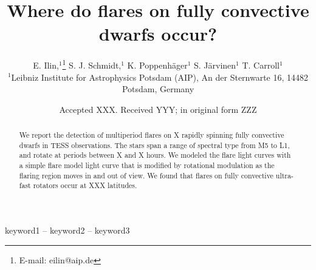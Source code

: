 \documentclass[fleqn,usenatbib,letters]{mnras}%
\title[Where do flares on fully convective dwarfs occur?]{Where do flares on fully convective dwarfs occur?}
\author[E. Ilin et al.]{
E. Ilin,$^{1}$\thanks{E-mail: eilin@aip.de}
S. J. Schmidt,$^{1}$
K. Poppenh\"ager$^{1}$
S. J\"arvinen$^{1}$
T. Carroll$^{1}$
\\
$^{1}$Leibniz Institute for Astrophysics Potsdam (AIP), An der Sternwarte 16, 14482 Potsdam, Germany\\
}
\date{Accepted XXX. Received YYY; in original form ZZZ}
\begin{document}
\label{firstpage}
\pagerange{\pageref{firstpage}--\pageref{lastpage}}
\maketitle

\begin{abstract}
We report the detection of multiperiod flares on X rapidly spinning fully convective dwarfs in TESS observations. The stars span a range of spectral type from M5 to L1, and rotate at periods between X and X hours. We modeled the flare light curves with a simple flare model light curve that is modified by rotational modulation as the flaring region moves in and out of view. We found that flares on fully convective ultra-fast rotators occur at XXX latitudes.
\end{abstract}

\begin{keywords}
keyword1 -- keyword2 -- keyword3
\end{keywords}




\end{document}
